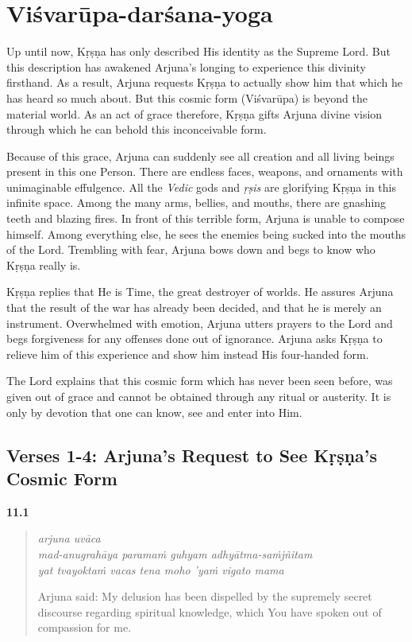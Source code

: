 \chapter{Viśvarūpa-darśana-yoga}\label{chap-visvarupa-darsana-yoga}

\noindent Up until now, Kṛṣṇa has only described His identity as the Supreme Lord. But this description has awakened Arjuna’s longing to experience this divinity firsthand. As a result, Arjuna requests Kṛṣṇa to actually show him that which he has heard so much about. But this cosmic form (Viśvarūpa) is beyond the material world. As an act of grace therefore, Kṛṣṇa gifts Arjuna divine vision through which he can behold this inconceivable form.

Because of this grace, Arjuna can suddenly see all creation and all living beings present in this one Person. There are endless faces, weapons, and ornaments with unimaginable effulgence. All the \textit{Vedic} gods and \textit{ṛṣis} are glorifying Kṛṣṇa in this infinite space. Among the many arms, bellies, and mouths, there are gnashing teeth and blazing fires. In front of this terrible form, Arjuna is unable to compose himself. Among everything else, he sees the enemies being sucked into the mouths of the Lord. Trembling with fear, Arjuna bows down and begs to know who Kṛṣṇa really is.

Kṛṣṇa replies that He is Time, the great destroyer of worlds. He assures Arjuna that the result of the war has already been decided, and that he is merely an instrument. Overwhelmed with emotion, Arjuna utters prayers to the Lord and begs forgiveness for any offenses done out of ignorance. Arjuna asks Kṛṣṇa to relieve him of this experience and show him instead His four-handed form.

The Lord explains that this cosmic form which has never been seen before, was given out of grace and cannot be obtained through any ritual or austerity. It is only by devotion that one can know, see and enter into Him.


\section{Verses 1-4: Arjuna's Request to See Kṛṣṇa's Cosmic Form}\label{sec-verses-1-4-arjuna-s-request-to-see-krsna-s-cosmic-form}

\par\noindent\textbf{11.1}\par
\begin{verse}
\textit{arjuna uvāca} \\
\textit{mad-anugrahāya paramaṁ guhyam adhyātma-saṁjñitam} \\
\textit{yat tvayoktaṁ vacas tena moho ’yaṁ vigato mama}

\noindent Arjuna said: My delusion has been dispelled by the supremely secret discourse regarding spiritual knowledge, which You have spoken out of compassion for me.
\end{verse}
\par



